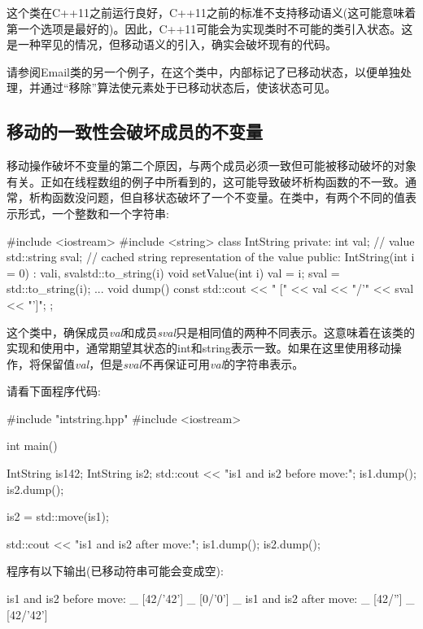 这个类在C++11之前运行良好，C++11之前的标准不支持移动语义(这可能意味着第一个选项是最好的)。因此，C++11可能会为实现类时不可能的类引入状态。这是一种罕见的情况，但移动语义的引入，确实会破坏现有的代码。

请参阅Email类的另一个例子，在这个类中，内部标记了已移动状态，以便单独处理，并通过“移除”算法使元素处于已移动状态后，使该状态可见。

\subsection{移动的一致性会破坏成员的不变量}

移动操作破坏不变量的第二个原因，与两个成员必须一致但可能被移动破坏的对象有关。正如在线程数组的例子中所看到的，这可能导致破坏析构函数的不一致。通常，析构函数没问题，但自移状态破坏了一个不变量。在类中，有两个不同的值表示形式，一个整数和一个字符串:

\begin{cppcode}
#include <iostream>
#include <string>
class IntString
{
	private:
	int val; // value
	std::string sval; // cached string representation of the value
	public:
	IntString(int i = 0)
	: val{i}, sval{std::to_string(i)} {
	}
	void setValue(int i) {
		val = i;
		sval = std::to_string(i);
	}
	...
	void dump() const {
		std::cout << " [" << val << "/'" << sval << "']\n";
	}
};
\end{cppcode}

这个类中，确保成员\textit{val}和成员\textit{sval}只是相同值的两种不同表示。这意味着在该类的实现和使用中，通常期望其状态的int和string表示一致。如果在这里使用移动操作，将保留值\textit{val}，但是\textit{sval}不再保证可用\textit{val}的字符串表示。

请看下面程序代码:

\begin{cppcode}
#include "intstring.hpp"
#include <iostream>

int main()
{
	IntString is1{42};
	IntString is2;
	std::cout << "is1 and is2 before move:\n";
	is1.dump();
	is2.dump();
	
	is2 = std::move(is1);
	
	std::cout << "is1 and is2 after move:\n";
	is1.dump();
	is2.dump();
}
\end{cppcode}

程序有以下输出(已移动符串可能会变成空):

\begin{shell}
is1 and is2 before move: _
 [42/'42'] _
 [0/'0'] _
is1 and is2 after move: _
 [42/''] _
 [42/'42']
\end{shell}

